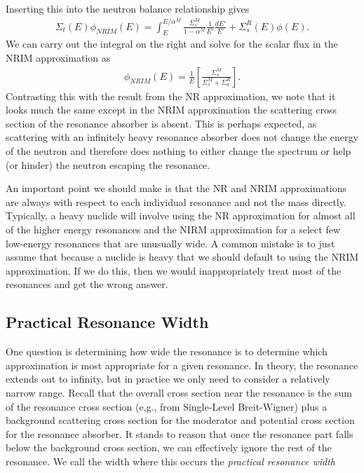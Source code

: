 Inserting this into the neutron balance relationship gives
\begin{align}
  \Sigma_t(E) \phi_{NRIM}(E) = \int_E^{E/\alpha^M} \frac{\Sigma_s^M}{ 1 - \alpha^M } \frac{1}{E'} \frac{dE'}{E'} + \Sigma_s^R(E) \phi(E) .
\end{align}
We can carry out the integral on the right and solve for the scalar flux in the NRIM approximation as
\begin{align}
  \phi_{NRIM}(E) = \frac{1}{E} \left[ \frac{ \Sigma_s^M }{ \Sigma_s^M + \Sigma_a^R } \right] . \label{Eq:thermalization_NRIM_FluxSpectrum}
\end{align}
Contrasting this with the result from the NR approximation, we note that it looks much the same except in the NRIM approximation the scattering cross section of the resonance absorber is absent. This is perhaps expected, as scattering with an infinitely heavy resonance absorber does not change the energy of the neutron and therefore does nothing to either change the spectrum or help (or hinder) the neutron escaping the resonance.

An important point we should make is that the NR and NRIM approximations are always with respect to each individual resonance and not the mass directly. Typically, a heavy nuclide will involve using the NR approximation for almost all of the higher energy resonances and the NIRM approximation for a select few low-energy resonances that are unusually wide. A common mistake is to just assume that because a nuclide is heavy that we should default to using the NRIM approximation. If we do this, then we would inappropriately treat most of the resonances and get the wrong answer.

\subsection{Practical Resonance Width}

One question is determining how wide the resonance is to determine which approximation is most appropriate for a given resonance. In theory, the resonance extends out to infinity, but in practice we only need to consider a relatively narrow range. Recall that the overall cross section near the resonance is the sum of the resonance cross section (e.g., from Single-Level Breit-Wigner) plus a background scattering cross section for the moderator and potential cross section for the resonance absorber. It stands to reason that once the resonance part falls below the background cross section, we can effectively ignore the rest of the resonance. We call the width where this occurs the \emph{practical resonance width}

